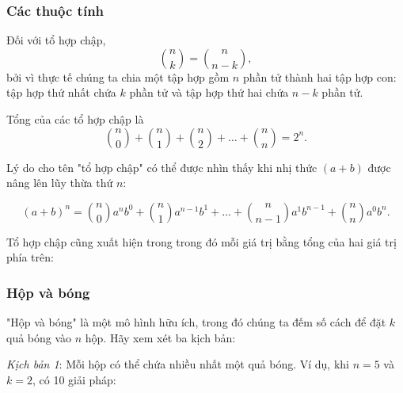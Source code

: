\subsubsection{Các thuộc tính}

Đối với tổ hợp chập,
\[
{n \choose k}  =  {n \choose n-k},
\]
bởi vì thực tế chúng ta chia một tập hợp gồm $n$ phần tử thành
hai tập hợp con: tập hợp thứ nhất chứa $k$ phần tử
và tập hợp thứ hai chứa $n-k$ phần tử.

Tổng của các tổ hợp chập là
\[
{n \choose 0}+{n \choose 1}+{n \choose 2}+\ldots+{n \choose n}=2^n.
\]

Lý do cho tên "tổ hợp chập"
có thể được nhìn thấy khi nhị thức $(a+b)$ được nâng lên
lũy thừa thứ $n$:

\[ (a+b)^n =
{n \choose 0} a^n b^0 + 
{n \choose 1} a^{n-1} b^1 +
\ldots + 
{n \choose n-1} a^1 b^{n-1} +
{n \choose n} a^0 b^n. \]


Tổ hợp chập cũng xuất hiện trong
trong đó mỗi giá trị bằng tổng của hai
giá trị phía trên:
\begin{center}
\end{center}

\subsubsection{Hộp và bóng}

"Hộp và bóng" là một mô hình hữu ích,
trong đó chúng ta đếm số cách để
đặt $k$ quả bóng vào $n$ hộp.
Hãy xem xét ba kịch bản:

\textit{Kịch bản 1}: Mỗi hộp có thể chứa
nhiều nhất một quả bóng.
Ví dụ, khi $n=5$ và $k=2$,
có 10 giải pháp:

